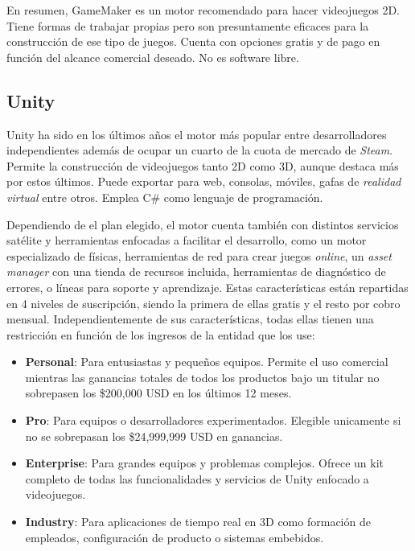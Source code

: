 En resumen, GameMaker es un motor recomendado para hacer videojuegos 2D. Tiene formas de trabajar propias pero son presuntamente eficaces para la construcción de ese tipo de juegos. Cuenta con opciones gratis y de pago en función del alcance comercial deseado. No es software libre.

\subsection{Unity}

Unity\cite{Unity} ha sido en los últimos años el motor más popular entre desarrolladores independientes además de ocupar un cuarto\cite{game-engine-report} de la cuota de mercado de \textit{Steam}. Permite la construcción de videojuegos tanto 2D como 3D, aunque destaca más por estos últimos. Puede exportar para web, consolas, móviles, gafas de \textit{realidad virtual} entre otros. Emplea C\# como lenguaje de programación.

Dependiendo de el plan elegido, el motor cuenta también con distintos servicios satélite y herramientas enfocadas a facilitar el desarrollo, como un motor especializado de físicas, herramientas de red para crear juegos \textit{online}, un \textit{asset manager} con una tienda de recursos incluida, herramientas de diagnóstico de errores, o líneas para soporte y aprendizaje. Estas características están repartidas en 4 niveles de suscripción, siendo la primera de ellas gratis y el resto por cobro mensual. Independientemente de sus características, todas ellas tienen una restricción\cite{unity-license} en función de los ingresos de la entidad que los use:

\begin{itemize}
    \item \textbf{Personal}: Para entusiastas y pequeños equipos. Permite el uso comercial mientras las ganancias totales de todos los productos bajo un titular no sobrepasen los \$200,000 USD en los últimos 12 meses.
    \item \textbf{Pro}: Para equipos o desarrolladores experimentados. Elegible unicamente si no se sobrepasan los \$24,999,999 USD en ganancias.
    \item \textbf{Enterprise}: Para grandes equipos y problemas complejos. Ofrece un kit completo de todas las funcionalidades y servicios de Unity enfocado a videojuegos.
    \item \textbf{Industry}: Para aplicaciones de tiempo real en 3D como formación de empleados, configuración de producto o sistemas embebidos.
\end{itemize}


